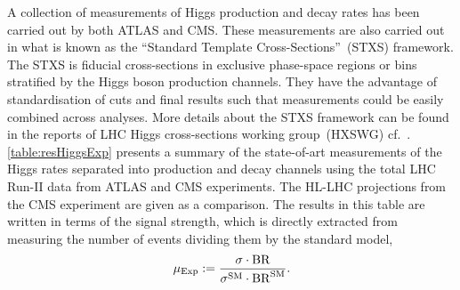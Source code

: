 A collection of measurements of Higgs production and decay rates has been carried out by both ATLAS and CMS. These measurements are also carried out in what is known as the ``Standard Template Cross-Sections''~(STXS) framework. The STXS is fiducial cross-sections in exclusive phase-space regions or bins stratified by the Higgs boson production channels. They have the advantage of standardisation of cuts and final results such that measurements could be easily combined across analyses. More details about the STXS framework can be found in the reports of  LHC Higgs cross-sections working group~(HXSWG) cf.~\cite{Berger:2019wnu}.  \autoref{table:resHiggsExp} presents a summary of the state-of-art measurements of the Higgs rates separated into production and decay channels using the total LHC Run-II data from ATLAS and CMS experiments. The HL-LHC projections from the CMS experiment are given as a comparison. The results in this table are written in terms of the signal strength, which is directly extracted from measuring the number of events dividing them by the standard model,
\begin{equation}
	\mu_{\mathrm{Exp}} := \frac{ \sigma \cdot \mathrm{BR}}{ \sigma^{\mathrm{SM}} \cdot \mathrm{BR}^{\mathrm{SM}}}.
\end{equation}
\newpage
\begingroup
 
\endgroup
\FloatBarrier
